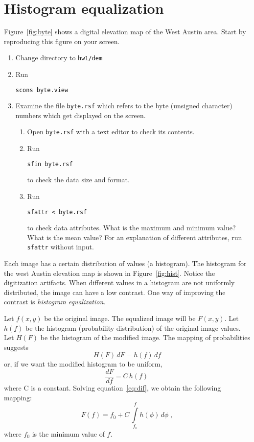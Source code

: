 \section{Histogram equalization}


Figure~\ref{fig:byte} shows a digital elevation map of the West Austin
area. Start by reproducing this figure on your screen.
\begin{enumerate}
\item Change directory to \verb#hw1/dem#
\item Run
\begin{verbatim}
scons byte.view
\end{verbatim}
\item Examine the file \texttt{byte.rsf} which refers to the 
byte (unsigned character) numbers which get displayed on the screen.
\begin{enumerate}
\item Open \texttt{byte.rsf} with a text editor to check its contents.
\item Run
\begin{verbatim}
sfin byte.rsf
\end{verbatim}
to check the data size and format.
\item Run
\begin{verbatim}
sfattr < byte.rsf
\end{verbatim}
to check data attributes. What is the maximum and minimum value? What
is the mean value? For an explanation of different attributes,
run \texttt{sfattr} without input.
\end{enumerate}
\end{enumerate}

Each image has a certain distribution of values (a histogram). The
histogram for the west Austin elevation map is shown in
Figure~\ref{fig:hist}. Notice the digitization artifacts. When
different values in a histogram are not uniformly distributed, the
image can have a low contrast. One way of improving the contrast is
\emph{histogram equalization}.


Let $f(x,y)$ be the original image. The equalized image will be
$F(x,y)$. Let $h(f)$ be the histogram (probability distribution) of
the original image values. Let $H(F)$ be the histogram of the modified
image. The mapping of probabilities suggests
\begin{equation}
\label{eq:prob}
H(F)\,dF = h(f)\,df
\end{equation}
or, if we want the modified histogram
to be uniform, 
\begin{equation}
\label{eq:dif}
\frac{d F}{d f} = C\,h(f)\,
\end{equation}
where C is a constant. 
Solving equation~\ref{eq:dif}, we obtain the following mapping:
\begin{equation}
\label{eq:int}
F(f) = f_0 + C\,\int\limits_{f_0}^f h(\phi)\,d\phi\;,
\end{equation}
where $f_0$ is the minimum value of $f$.

